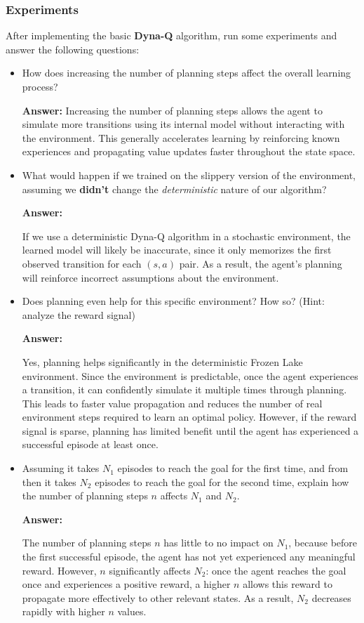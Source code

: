 \subsubsection{Experiments}
After implementing the basic \textbf{Dyna-Q} algorithm, run some experiments and answer the following questions:
\begin{itemize} 
    \item How does increasing the number of planning steps affect the overall learning process? 

    \textbf{Answer:}
    Increasing the number of planning steps allows the agent to simulate more transitions using its internal model without interacting with the environment. This generally accelerates learning by reinforcing known experiences and propagating value updates faster throughout the state space.
    
    \item What would happen if we trained on the slippery version of the environment, assuming we \textbf{didn't} change the \textit{deterministic} nature of our algorithm? 

    \textbf{Answer:}
    
    If we use a deterministic Dyna-Q algorithm in a stochastic environment, the learned model will likely be inaccurate, since it only memorizes the first observed transition for each $(s, a)$ pair. As a result, the agent’s planning will reinforce incorrect assumptions about the environment.

    \item Does planning even help for this specific environment? How so? (Hint: analyze the reward signal) 

    \textbf{Answer:}
    
    Yes, planning helps significantly in the deterministic Frozen Lake environment. Since the environment is predictable, once the agent experiences a transition, it can confidently simulate it multiple times through planning. This leads to faster value propagation and reduces the number of real environment steps required to learn an optimal policy. However, if the reward signal is sparse, planning has limited benefit until the agent has experienced a successful episode at least once.

    \item Assuming it takes $N_1$ episodes to reach the goal for the first time, and from then it takes $N_2$ episodes to reach the goal for the second time, explain how the number of planning steps $n$ affects $N_1$ and $N_2$.

    \textbf{Answer:}

    The number of planning steps $n$ has little to no impact on $N_1$, because before the first successful episode, the agent has not yet experienced any meaningful reward. However, $n$ significantly affects $N_2$: once the agent reaches the goal once and experiences a positive reward, a higher $n$ allows this reward to propagate more effectively to other relevant states. As a result, $N_2$ decreases rapidly with higher $n$ values.

\end{itemize}

